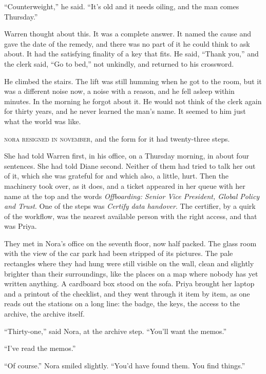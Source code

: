 ``Counterweight,'' he said. ``It's old and it needs oiling, and the man comes Thursday.''

Warren thought about this. It was a complete answer. It named the cause and gave the date of the remedy, and there was no part of it he could think to ask about. It had the satisfying finality of a key that fits. He said, ``Thank you,'' and the clerk said, ``Go to bed,'' not unkindly, and returned to his crossword.

He climbed the stairs. The lift was still humming when he got to the room, but it was a different noise now, a noise with a reason, and he fell asleep within minutes. In the morning he forgot about it. He would not think of the clerk again for thirty years, and he never learned the man's name. It seemed to him just what the world was like.


\textsc{nora resigned in november,} and the form for it had twenty-three steps.

She had told Warren first, in his office, on a Thursday morning, in about four sentences. She had told Diane second. Neither of them had tried to talk her out of it, which she was grateful for and which also, a little, hurt. Then the machinery took over, as it does, and a ticket appeared in her queue with her name at the top and the words \emph{Offboarding: Senior Vice President, Global Policy and Trust}. One of the steps was \emph{Certify data handover}. The certifier, by a quirk of the workflow, was the nearest available person with the right access, and that was Priya.

They met in Nora's office on the seventh floor, now half packed. The glass room with the view of the car park had been stripped of its pictures. The pale rectangles where they had hung were still visible on the wall, clean and slightly brighter than their surroundings, like the places on a map where nobody has yet written anything. A cardboard box stood on the sofa. Priya brought her laptop and a printout of the checklist, and they went through it item by item, as one reads out the stations on a long line: the badge, the keys, the access to the archive, the archive itself.

``Thirty-one,'' said Nora, at the archive step. ``You'll want the memos.''

``I've read the memos.''

``Of course.'' Nora smiled slightly. ``You'd have found them. You find things.''


